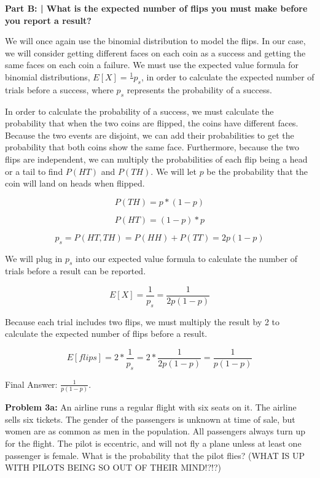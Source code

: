 \documentclass{article}
\begin{document}
 \newline
 
 \textbf{Part B: | What is the expected number of flips you must make before you report a result?}\newline
 
 We will once again use the binomial distribution to model the flips. In our case, we will consider getting different faces on each coin as a success and getting the same faces on each coin a failure. We must use the expected value formula for binomial distributions, $E[X] = \frac{1}{}p_s$, in order to calculate the expected number of trials before a success, where $p_s$ represents the probability of a success.
 
 In order to calculate the probability of a success, we must calculate the probability that when the two coins are flipped, the coins have different faces. Because the two events are disjoint, we can add their probabilities to get the probability that both coins show the same face. Furthermore, because the two flips are independent, we can multiply the probabilities of each flip being a head or a tail to find $P(HT)$ and $P(TH)$. We will let $p$ be the probability that the coin will land on heads when flipped.
 
 \[P(TH)=p*(1-p)\]
 
 \[P(HT)=(1-p)*p\]
 
 \[p_s = P(HT, TH)=P(HH) + P(TT) = 2p(1-p)\]
 
 We will plug in $p_s$ into our expected value formula to calculate the number of trials before a result can be reported.
 
 \[E[X] = \frac{1}{p_s} = \frac{1}{2p(1-p)}\]
 
 Because each trial includes two flips, we must multiply the result by 2 to calculate the expected number of flips before a result.
 
  \[E[flips] = 2 * \frac{1}{p_s} = 2*\frac{1}{2p(1-p)} = \frac{1}{p(1-p)}\]
 
 Final Answer: $\frac{1}{p(1-p)}$.\newline
 
 \newpage
 
 \noindent\makebox[\linewidth]{\rule{\paperwidth}{0.4pt}}\newline

 \begin{center}
      \Large\textbf{Problem 3a:} An airline runs a regular flight with six seats on it. The airline sells six tickets. The gender of the passengers is unknown at time of sale, but women are as common as men in the population. All passengers always turn up for the flight. The pilot is eccentric, and will not fly a plane unless at least one passenger is female. What is the probability that the pilot flies? (WHAT IS UP WITH PILOTS BEING SO OUT OF THEIR MIND!?!?)\par
 \end{center}
 
\end{document}
